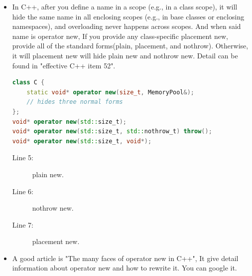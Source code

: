 \documentclass[a4paper,11pt,twoside]{book}
\begin{document}
\begin{itemize}
		\item In C++, after you define a name in a scope (e.g., in a class scope), it will hide the same name in all enclosing scopes (e.g., in base classes or enclosing namespaces), and overloading never happens across scopes. And when said name is operator new, If you provide any class-specific placement new, provide all of the standard forms(plain, placement, and nothrow). Otherwise, it will placement new will hide plain new and nothrow new. Detail can be found in "effective C++ item 52".
\begin{lstlisting}[frame=single, language=c++, mathescape=true]
class C {
	static void* operator new(size_t, MemoryPool&);
	// hides three normal forms
};
void* operator new(std::size_t);
void* operator new(std::size_t, std::nothrow_t) throw();
void* operator new(std::size_t, void*);		
\end{lstlisting}
	\begin{description}
		\item[Line 5:] plain new.
		\item[Line 6:] nothrow new.
		\item[Line 7:] placement new.
	\end{description} 


	\item A good article is "The many faces of operator new in C++", It give  detail information about operator new and how to rewrite it. You can google it.
\end{itemize}
\end{document}
